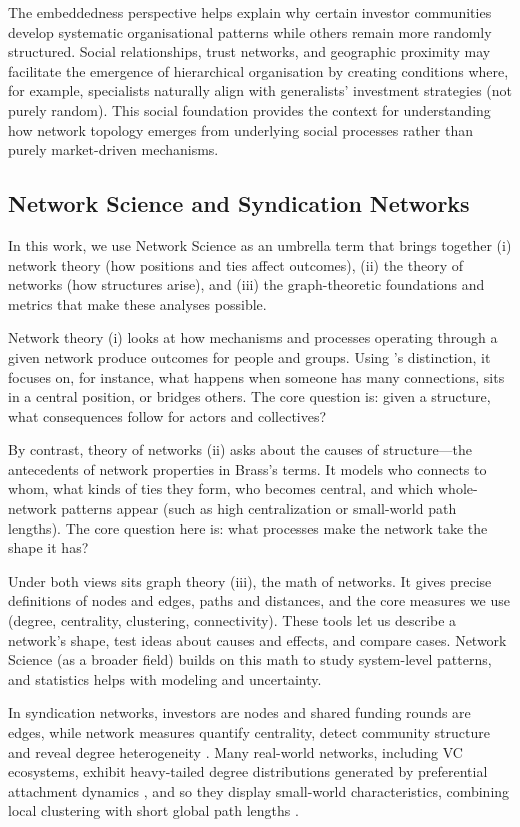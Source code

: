 The embeddedness perspective helps explain why certain investor communities develop systematic organisational patterns while others remain more randomly structured. Social relationships, trust networks, and geographic proximity may facilitate the emergence of hierarchical organisation by creating conditions where, for example, specialists naturally align with generalists' investment strategies (not purely random). This social foundation provides the context for understanding how network topology emerges from underlying social processes rather than purely market-driven mechanisms.

\subsection{Network Science and Syndication Networks}

In this work, we use Network Science as an umbrella term that brings together (i) network theory (how positions and ties affect outcomes), (ii) the theory of networks (how structures arise), and (iii) the graph-theoretic foundations and metrics that make these analyses possible.

Network theory (i) looks at how mechanisms and processes operating through a given network produce outcomes for people and groups. Using \cite{VargasHernandez2019}’s distinction, it focuses on, for instance, what happens when someone has many connections, sits in a central position, or bridges others. The core question is: given a structure, what consequences follow for actors and collectives? 

By contrast, theory of networks (ii) asks about the causes of structure—the antecedents of network properties in Brass’s terms. It models who connects to whom, what kinds of ties they form, who becomes central, and which whole-network patterns appear (such as high centralization or small-world path lengths). The core question here is: what processes make the network take the shape it has?

Under both views sits graph theory (iii), the math of networks. It gives precise definitions of nodes and edges, paths and distances, and the core measures we use (degree, centrality, clustering, connectivity). These tools let us describe a network’s shape, test ideas about causes and effects, and compare cases. Network Science (as a broader field) builds on this math to study system-level patterns, and statistics helps with modeling and uncertainty.

In syndication networks, investors are nodes and shared funding rounds are edges, while network measures quantify centrality, detect community structure and reveal degree heterogeneity \cite{Borgatti2009,Newman2003}. Many real-world networks, including VC ecosystems, exhibit heavy-tailed degree distributions generated by preferential attachment dynamics \cite{Barabasi1999}, and so they display small-world characteristics, combining local clustering with short global path lengths \cite{Watts1998}.

